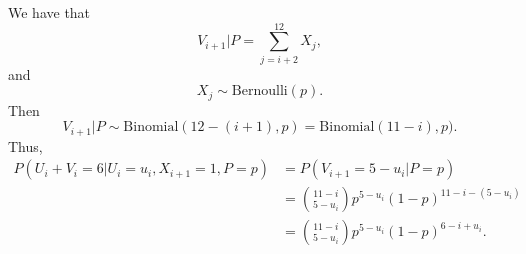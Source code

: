 We have that 
\begin{equation*}
    V_{i+1}|P = \sum_{j=i+2}^{12} X_j,
\end{equation*}
and
\begin{equation*}
   X_j \sim \text{Bernoulli}(p). 
\end{equation*}
Then
\begin{equation*}
    V_{i+1}|P \sim \text{Binomial}(12-(i+1),p) = \text{Binomial}(11-i),p).
\end{equation*}
Thus, 
\begin{equation}
\label{majority_given_nextisred}
    \begin{aligned}
        P(U_i+V_i=6|U_i=u_i,X_{i+1}=1,P=p)
        &= P(V_{i+1}=5-u_i|P=p)\\[6pt]
        &= \binom{11-i}{5-u_i} p^{5-u_i}(1-p)^{11-i-(5-u_i)}\\[6pt]
        &= \binom{11-i}{5-u_i} p^{5-u_i}(1-p)^{6-i+u_i}.
    \end{aligned}
\end{equation}

